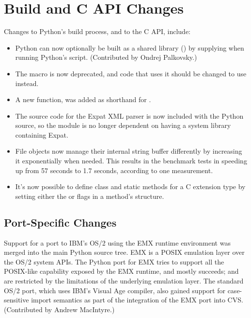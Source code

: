 \documentclass{howto}
\begin{document}
\section{Build and C API Changes}

Changes to Python's build process, and to the C API, include:

\begin{itemize}

\item Python can now optionally be built as a shared library
() by supplying 
when running Python's  script.  (Contributed by Ondrej
Palkovsky.)

\item The  macro is now deprecated, and code
that
uses it should be changed to use 
instead.

\item A new function,  was added
as shorthand for 
.

\item The source code for the Expat XML parser is now included with
the Python source, so the  module is no longer
dependent on having a system library containing Expat.

\item File objects now manage their internal string buffer
differently by increasing it exponentially when needed.  
This results in the benchmark tests in  
speeding up from 57 seconds to 1.7 seconds, according to one
measurement.

\item It's now possible to define class and static methods for a C
extension type by setting either the  or
 flags in a method's 
structure.

\end{itemize}

\subsection{Port-Specific Changes}

Support for a port to IBM's OS/2 using the EMX runtime environment was
merged into the main Python source tree.  EMX is a POSIX emulation
layer over the OS/2 system APIs.  The Python port for EMX tries to
support all the POSIX-like capability exposed by the EMX runtime, and
mostly succeeds;  and  are
restricted by the limitations of the underlying emulation layer.  The
standard OS/2 port, which uses IBM's Visual Age compiler, also gained
support for case-sensitive import semantics as part of the integration
of the EMX port into CVS.  (Contributed by Andrew MacIntyre.)
\end{document}
